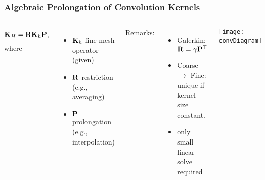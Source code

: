 \documentclass[12pt,fleqn,handout]{beamer}
\begin{document}
\begin{frame}\frametitle{Algebraic Prolongation of Convolution Kernels}

\begin{columns}
	\begin{equation*}
		{\bf K}_H = {\bf R} {\bf K}_h {\bf P},
	\end{equation*}
	where
	\begin{itemize}
		\item ${\bf K}_h$ fine mesh operator (given)
		\item ${\bf R}$ restriction (e.g., averaging)
		\item ${\bf P}$ prolongation (e.g., interpolation)
	\end{itemize}
	
	
	\pause
 	Remarks:
\begin{itemize}
	\item Galerkin: ${\bf R} = \gamma{\bf P}^\top$
	\item Coarse $\rightarrow$ Fine: unique if kernel size constant.
	\item only small linear solve required 
\end{itemize}


	
	\pause
	\texttt{[image: convDiagram]}
	
	
\end{columns}
\end{frame}
\end{document}
